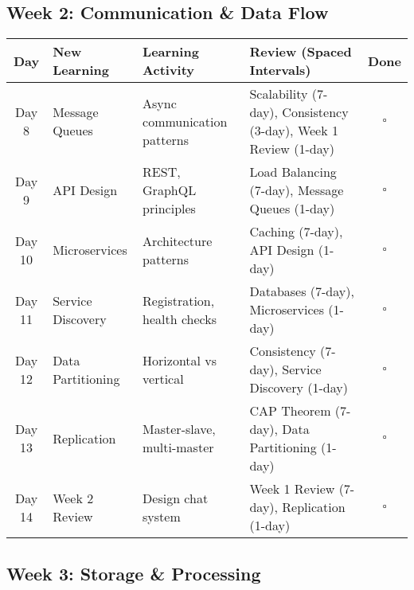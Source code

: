 \documentclass[10pt,a4paper]{article}
\begin{document}
\subsection{Week 2: Communication \& Data Flow}

\begin{table}[h]
\centering
\small
\begin{tabular}{|c|p{3cm}|p{4cm}|p{4cm}|c|}
\hline
\textbf{Day} & \textbf{New Learning} & \textbf{Learning Activity} & \textbf{Review (Spaced Intervals)} & \textbf{Done} \\
\hline
Day 8 & Message Queues & Async communication patterns & Scalability (7-day), Consistency (3-day), Week 1 Review (1-day) & $\square$ \\
\hline
Day 9 & API Design & REST, GraphQL principles & Load Balancing (7-day), Message Queues (1-day) & $\square$ \\
\hline
Day 10 & Microservices & Architecture patterns & Caching (7-day), API Design (1-day) & $\square$ \\
\hline
Day 11 & Service Discovery & Registration, health checks & Databases (7-day), Microservices (1-day) & $\square$ \\
\hline
Day 12 & Data Partitioning & Horizontal vs vertical & Consistency (7-day), Service Discovery (1-day) & $\square$ \\
\hline
Day 13 & Replication & Master-slave, multi-master & CAP Theorem (7-day), Data Partitioning (1-day) & $\square$ \\
\hline
Day 14 & Week 2 Review & Design chat system & Week 1 Review (7-day), Replication (1-day) & $\square$ \\
\hline
\end{tabular}
\end{table}

\subsection{Week 3: Storage \& Processing}
\end{document}
